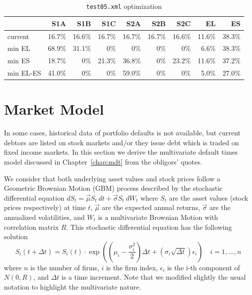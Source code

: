 \documentclass[11pt,fleqn]{book} %
\begin{document}
\begin{table}[!hb]
\begin{tabular}{l|rrrrrr|rr}
	          & S1A   & S1B   & S1C   & S2A   & S2B   & S2C   & EL    & ES \\
	\hline
	current   &16.7\% &16.6\% &16.7\% &16.7\% &16.7\% &16.6\% &11.6\% &38.3\% \\
	min EL    &68.9\% &31.1\% &   0\% &   0\% &   0\% &   0\% & 6.6\% &38.3\% \\
	min ES    &18.7\% &   0\% &21.3\% &36.8\% &   0\% &23.2\% &11.6\% &37.2\% \\
	min EL-ES &41.0\% &   0\% &   0\% &59.0\% &   0\% &   0\% & 5.0\% &27.0\% \\
\end{tabular}
	\caption{\texttt{test05.xml} optimization}
	\label{tab:optim1}
\end{table}

\section{Market Model}

In some cases, historical data of portfolio defaults is not available, but 
current debtors are listed on stock markets and/or they issue debt which is 
traded on fixed income markets. In this section we derive the multivariate 
default times model discussed in Chapter~\ref{chap:mdt} from the obligors' 
quotes.

We consider that both underlying asset values and stock prices follow a 
Geometric Brownian Motion (GBM) process described by the stochastic 
differential equation $dS_t = \vec{\mu} S_t\ dt + \vec{\sigma} S_t\ dW_t$
where $S_t$ are the asset values (stock prices respectively) at time $t$, 
$\vec{\mu}$ are the expected annual returns, $\vec{\sigma}$ are the annualized 
volatilities, and $W_t$ is a multivariate Brownian Motion with correlation 
matrix $R$. This stochastic differential equation has the following solution
\begin{equation}
	\label{eq:mgbm}
	S_i(t+\Delta t) = S_i(t) \cdot \exp\left(
	\left(\mu_i - \frac{\sigma_i^2}{2}\right) \Delta t +
	\left(\sigma_i \sqrt{\Delta t}\right) \epsilon_i
	\right) 
	\quad 
	i = 1,\dots,n
\end{equation}
where $n$ is the number of firms, $i$ is the firm index, $\epsilon_i$ is the 
i-th component of $N(0,R)$, and $\Delta t$ is a time increment. Note that we 
modified slightly the usual notation to highlight the multivariate nature.
\end{document}
